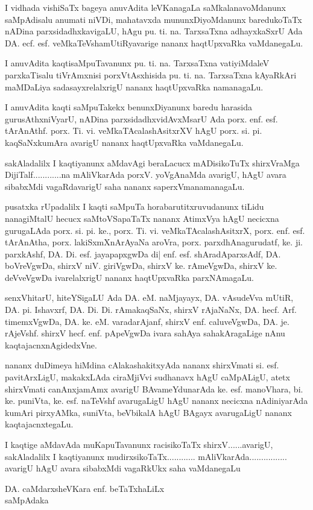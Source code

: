 I vidhada vishiSaTx bageya anuvAdita leVKanagaLa saMkalanavoMdanunx saMpAdisalu anumati niVDi, mahatavxda mununxDiyoMdanunx baredukoTaTx nADina parxsidadhxkavigaLU, hAgu pu. ti. na. TarxsaTxna adhayxkaSxrU Ada DA. ecf. esf. veMkaTeVshamUtiRyavarige nananx haqtUpxvaRka vaMdanegaLu.

I anuvAdita kaqtisaMpuTavanunx pu. ti. na. TarxsaTxna vatiyiMdaleV parxkaTisalu tiVrAmxnisi porxVtAsxhisida pu. ti. na. TarxsaTxna kAyaRkAri maMDaLiya sadasayxrelalxrigU nananx haqtUpxvaRka namanagaLu. 

I anuvAdita kaqti saMpuTakekx benunxDiyanunx baredu  harasida gurusAthxniVyarU, nADina parxsidadhxvidAvxMsarU Ada porx. enf. esf. tArAnAthf. porx. Ti. vi. veMkaTAcalashAsitxrXV hAgU porx. si. pi. kaqSaNxkumAra avarigU nananx haqtUpxvaRka vaMdanegaLu.

 sakAladalilx I kaqtiyanunx aMdavAgi beraLacucx mADisikoTuTx shirxVraMga DijiTalf............na mAliVkarAda porxV. yoVgAnaMda avarigU, hAgU avara sibabxMdi vagaRdavarigU saha nananx saperxVmanamanagaLu.

pusatxka rUpadalilx I kaqti saMpuTa horabarutitxruvudanunx tiLidu nanagiMtalU hecucx saMtoVSapaTaTx nananx AtimxVya hAgU necicxna gurugaLAda porx. si. pi. ke., porx. Ti. vi. veMkaTAcalashAsitxrX, porx. enf. esf. tArAnAtha, porx. lakiSxmXnArAyaNa aroVra, porx. parxdhAnagurudatf, ke. ji. parxkAshf, DA. Di. esf. jayapapxgwDa di| enf. esf. shAradAparxsAdf, DA. boVreVgwDa, shirxV niV. giriVgwDa, shirxV ke. rAmeVgwDa, shirxV ke. deVveVgwDa ivarelalxrigU nananx haqtUpxvaRka parxNAmagaLu. 

senxVhitarU, hiteYSigaLU Ada DA. eM. naMjayayx, DA. vAsudeVva mUtiR, DA. pi. Ishavxrf, DA. Di. Di. rAmakaqSaNx, shirxV rAjaNaNx, DA. hecf. Arf. timemxVgwDa, DA. ke. eM. varadarAjanf, shirxV enf. caluveVgwDa, DA. je. rAjeVshf. shirxV hecf. enf. pApeVgwDa ivara sahAya sahakAragaLige nAnu kaqtajacnxnAgidedxVne.

nananx duDimeya hiMdina cAlakashakitxyAda nananx shirxVmati si. esf. pavitArxLigU, makakxLAda ciraMjiVvi sudhanavx hAgU caMpALigU, atetx shirxVmati canAnxjamAmx avarigU BAvameYdunarAda ke. esf. manoVhara, bi. ke. puniVta, ke. esf. naTeVshf avarugaLigU hAgU nananx necicxna nAdiniyarAda kumAri pirxyAMka, suniVta, beVbikalA hAgU BAgayx avarugaLigU nananx kaqtajacnxtegaLu.

I kaqtige aMdavAda muKapuTavanunx racisikoTaTx shirxV......avarigU, sakAladalilx I kaqtiyanunx mudirxsikoTaTx............ mAliVkarAda................ avarigU hAgU avara sibabxMdi vagaRkUkx saha vaMdanegaLu

\begin{flushright}
DA. caMdarxsheVKara enf. beTaTxhaLiLx\\
saMpAdaka
\end{flushright}
